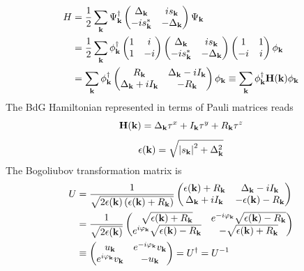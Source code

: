 \begin{align*}
H 
&= 
\frac{1}{2}
\sum_{\mathbf{k}}
\Psi_{\mathbf{k}}^\dagger
\begin{pmatrix}
  \Delta_{\mathbf{k}} & is_{\mathbf{k}} \\
  -is_{\mathbf{k}}^* & -\Delta_{\mathbf{k}}
\end{pmatrix}
\Psi_{\mathbf{k}} \\
&=
\frac{1}{2}
\sum_{\mathbf{k}}
\phi_{\mathbf{k}}^\dagger
\begin{pmatrix}
    1 & i \\
    1 & -i
\end{pmatrix}
\begin{pmatrix}
  \Delta_{\mathbf{k}} & is_{\mathbf{k}} \\
  -is_{\mathbf{k}}^* & -\Delta_{\mathbf{k}}
\end{pmatrix}
\begin{pmatrix}
    1 & 1 \\
    -i & i
\end{pmatrix}
\phi_{\mathbf{k}} \\
&= 
\sum_{\mathbf{k}}
\phi_{\mathbf{k}}^\dagger
\begin{pmatrix}
    R_{\mathbf{k}} & \Delta_{\mathbf{k}} - iI_{\mathbf{k}} \\
    \Delta_{\mathbf{k}} + iI_{\mathbf{k}} & -R_{\mathbf{k}}
\end{pmatrix}
\phi_{\mathbf{k}}
\equiv 
\sum_{\mathbf{k}} 
\phi_{\mathbf{k}}^\dagger
\mathbf{H}(\mathbf{k})
\phi_{\mathbf{k}}
\end{align*}
The BdG Hamiltonian represented in terms of Pauli matrices reads
\begin{equation}\label{eq:BdG-magnetic}
\mathbf{H}(\mathbf{k})
=
\Delta_{\mathbf{k}} \tau^x
+
I_{\mathbf{k}} \tau^y
+
R_{\mathbf{k}} \tau^z
\end{equation}
\[
\epsilon(\mathbf{k})
=
\sqrt{
\left| s_{\mathbf{k}} \right|^2 + \Delta_{\mathbf{k}}^2
}
\]
The Bogoliubov transformation matrix is
\begin{align}
    U 
    &= 
    \frac{1}{\sqrt{2 \epsilon(\mathbf{k}) \left( \epsilon(\mathbf{k}) + R_{\mathbf{k}} \right)}}
    \begin{pmatrix}
        \epsilon(\mathbf{k}) + R_{\mathbf{k}} & \Delta_{\mathbf{k}} - iI_{\mathbf{k}} \\
        \Delta_{\mathbf{k}} + iI_{\mathbf{k}} & -\epsilon(\mathbf{k}) - R_{\mathbf{k}}
    \end{pmatrix} \nonumber\\
    & =
    \frac{1}{\sqrt{2\epsilon(\mathbf{k})}}
    \begin{pmatrix}
        \sqrt{\epsilon(\mathbf{k}) + R_{\mathbf{k}}} & e^{-i\varphi_{\mathbf{k}}} \sqrt{\epsilon(\mathbf{k}) - R_{\mathbf{k}}} \\
        e^{i\varphi_{\mathbf{k}}} \sqrt{\epsilon(\mathbf{k}) - R_{\mathbf{k}}} & - \sqrt{\epsilon(\mathbf{k}) + R_{\mathbf{k}}} 
    \end{pmatrix} \nonumber \\
    &\equiv
    \begin{pmatrix}
        u_{\mathbf{k}} & e^{-i\varphi_{\mathbf{k}}} v_{\mathbf{k}} \\
        e^{i\varphi_{\mathbf{k}}}v_{\mathbf{k}} & -u_{\mathbf{k}}
    \end{pmatrix} = U^\dagger = U^{-1}
\end{align}
